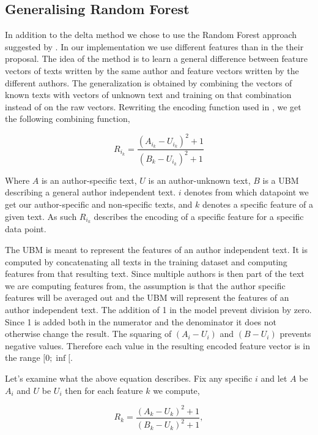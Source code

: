\subsection{Generalising Random Forest}
\label{subsec:Generalising Random Forest}
In addition to the delta method we chose to use the Random Forest approach
suggested by \cite{pacheco2015}. In our implementation we use different
features than in the their proposal. The idea of the method is to learn a
general difference between feature vectors of texts written by the same author
and feature vectors written by the different authors. The generalization is
obtained by combining the vectors of known texts with vectors of unknown
text and training on that combination instead of on the raw vectors. Rewriting the encoding function used in \cite{pacheco2015}, we get the following combining function,

\begin{equation}
        R_{i_k} = \frac{(A_{i_k}-U_{i_k})^2+1}{(B_k-U_{i_k})^2+1}
\end{equation}

Where $A$ is an author-specific text, $U$ is an author-unknown text, $B$ is a \gls{UBM}
describing a general author independent text. $i$ denotes from which datapoint we get our author-specific and non-specific texts, and $k$ denotes a specific feature of a given text. As such $R_{i_k}$ describes the encoding of a specific feature for a specific data point.

The \gls{UBM} is meant to represent the features of an author independent text.
It is computed by concatenating all texts in the training dataset and computing
features from that resulting text. Since multiple authors is then part of the
text we are computing features from, the assumption is that the author specific
features will be averaged out and the \gls{UBM} will represent the features of
an author independent text. The addition of 1 in the model prevent division
by zero. Since 1 is added both in the numerator and the denominator it does
not otherwise change the result. The squaring of $(A_i - U_i)$ and $(B - U_i)$
prevents negative values. Therefore each value in the resulting encoded feature
vector is in the range $[0; \inf[$.

Let's examine what the above equation describes. Fix any specific $i$ and let
$A$ be $A_i$ and $U$ be $U_i$ then for each feature $k$ we compute,

\begin{equation}
\label{eq:rf-encode}
    R_k = \frac{(A_k-U_k)^2+1}{(B_k-U_k)^2+1},
\end{equation}

